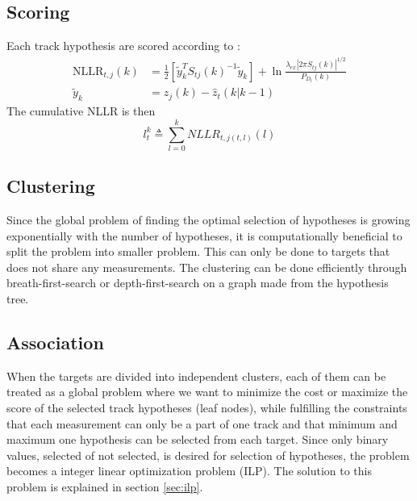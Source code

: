 \subsection{Scoring}
Each track hypothesis are scored according to \cite{Bar-Shalom2007}:
\begin{equation}
\begin{split}
\mathrm{NLLR}_{t,j}(k) &= \frac{1}{2} \left[ \tilde{y}_k^T S_{tj}(k)^{-1} \tilde{y}_k \right] + \ln \frac{\lambda_{ex} |2 \pi S_{tj}(k)|^{1/2}}{P_{D_t}(k)} \\				
\tilde{y}_k &= z_j(k)-\hat{z}_t(k|k-1)
\end{split}
\end{equation}
The cumulative NLLR is then
\begin{equation}
l_t^k \triangleq \sum_{l=0}^k NLLR_{t,j(t,l)}(l)
\end{equation}

\subsection{Clustering}
Since the global problem of finding the optimal selection of hypotheses is growing exponentially with the number of hypotheses, it is computationally beneficial to split the problem into smaller problem. This can only be done to targets that does not share any measurements. The clustering can be done efficiently through breath-first-search or depth-first-search on a graph made from the hypothesis tree.

\subsection{Association}
When the targets are divided into independent clusters, each of them can be treated as a global problem where we want to minimize the cost or maximize the score of the selected track hypotheses (leaf nodes), while fulfilling the constraints that each measurement can only be a part of one track and that minimum and maximum one hypothesis can be selected from each target. Since only binary values, selected of not selected, is desired for selection of hypotheses, the problem becomes a integer linear optimization problem (ILP). The solution to this problem is explained in section \ref{sec:ilp}.


